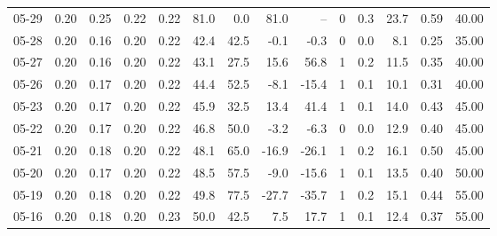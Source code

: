 \begin{threeparttable}
{\begin{tabular}{lrrrrrrrrrrrrr}
  05-29 &          0.20 &          0.25 &          0.22 &        0.22 &                81.0 &                 0.0 &       81.0 &           -- &              0 &                 0.3 &             23.7 &            0.59 &                  40.00 \\
  05-28 &          0.20 &          0.16 &          0.20 &        0.22 &                42.4 &                42.5 &       -0.1 &         -0.3 &              0 &                 0.0 &              8.1 &            0.25 &                  35.00 \\
  05-27 &          0.20 &          0.16 &          0.20 &        0.22 &                43.1 &                27.5 &       15.6 &         56.8 &              1 &                 0.2 &             11.5 &            0.35 &                  40.00 \\
  05-26 &          0.20 &          0.17 &          0.20 &        0.22 &                44.4 &                52.5 &       -8.1 &        -15.4 &              1 &                 0.1 &             10.1 &            0.31 &                  40.00 \\
  05-23 &          0.20 &          0.17 &          0.20 &        0.22 &                45.9 &                32.5 &       13.4 &         41.4 &              1 &                 0.1 &             14.0 &            0.43 &                  45.00 \\
  05-22 &          0.20 &          0.17 &          0.20 &        0.22 &                46.8 &                50.0 &       -3.2 &         -6.3 &              0 &                 0.0 &             12.9 &            0.40 &                  45.00 \\
  05-21 &          0.20 &          0.18 &          0.20 &        0.22 &                48.1 &                65.0 &      -16.9 &        -26.1 &              1 &                 0.2 &             16.1 &            0.50 &                  45.00 \\
  05-20 &          0.20 &          0.17 &          0.20 &        0.22 &                48.5 &                57.5 &       -9.0 &        -15.6 &              1 &                 0.1 &             13.5 &            0.40 &                  50.00 \\
  05-19 &          0.20 &          0.18 &          0.20 &        0.22 &                49.8 &                77.5 &      -27.7 &        -35.7 &              1 &                 0.2 &             15.1 &            0.44 &                  55.00 \\
  05-16 &          0.20 &          0.18 &          0.20 &        0.23 &                50.0 &                42.5 &        7.5 &         17.7 &              1 &                 0.1 &             12.4 &            0.37 &                  55.00 \\

\end{tabular}}
\end{threeparttable}
